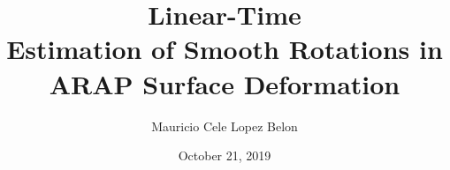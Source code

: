 \documentclass{birkjour}
\numberwithin{equation}{section}
\begin{document}
%
%
%
%
%
%
%
%
%


\title[Linear-Time Estimation of Smooth Rotations in ARAP Deformation]
 {Linear-Time \\Estimation of Smooth Rotations in \\ARAP Surface Deformation}

\author[Mauricio Cele Lopez Belon]{Mauricio Cele Lopez Belon}
\address{Madrid, Spain}



\date{October 21, 2019}
\end{document}
